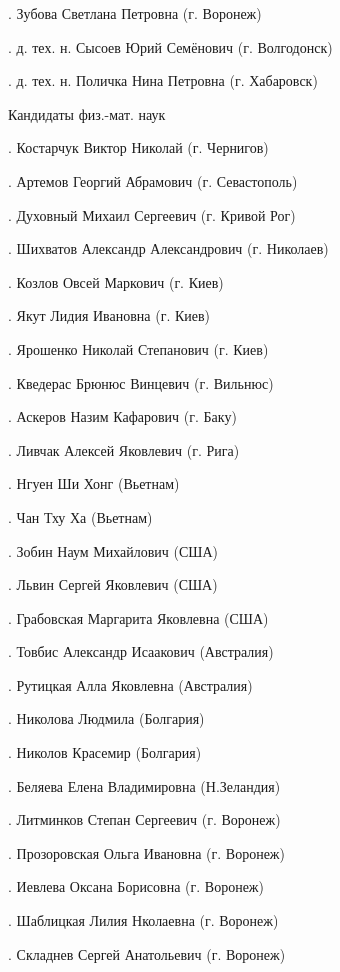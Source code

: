 .	 Зубова Светлана Петровна (г. Воронеж)

.	 д. тех. н. Сысоев Юрий Семёнович (г. Волгодонск)

.	 д. тех. н. Поличка Нина Петровна (г. Хабаровск)

                     Кандидаты физ.-мат. наук

.	Костарчук Виктор Николай (г. Чернигов)

.	Артемов Георгий Абрамович (г. Севастополь)

.	Духовный Михаил Сергеевич (г. Кривой Рог)

.	Шихватов Александр Александрович (г. Николаев)

.	Козлов Овсей Маркович (г. Киев)

.	Якут Лидия Ивановна (г. Киев)

.	Ярошенко Николай Степанович (г. Киев)

.	Кведерас Брюнюс Винцевич (г. Вильнюс)

.	Аскеров Назим Кафарович (г. Баку)

.	Ливчак Алексей Яковлевич (г. Рига)

.	Нгуен Ши Хонг   (Вьетнам)

.	Чан Тху Ха (Вьетнам)

.	Зобин Наум Михайлович (США)

.	Львин Сергей Яковлевич (США)

.	Грабовская Маргарита Яковлевна (США)

.	Товбис Александр Исаакович (Австралия)

.	Рутицкая Алла Яковлевна (Австралия)

.	Николова Людмила (Болгария)

.	Николов Красемир (Болгария)

.	Беляева Елена Владимировна (Н.Зеландия)

.	Литминков Степан Сергеевич (г. Воронеж)

.	Прозоровская Ольга Ивановна (г. Воронеж)

.	Иевлева Оксана Борисовна (г. Воронеж)

.	Шаблицкая Лилия Нколаевна (г. Воронеж)

.	Складнев Сергей Анатольевич (г. Воронеж)

